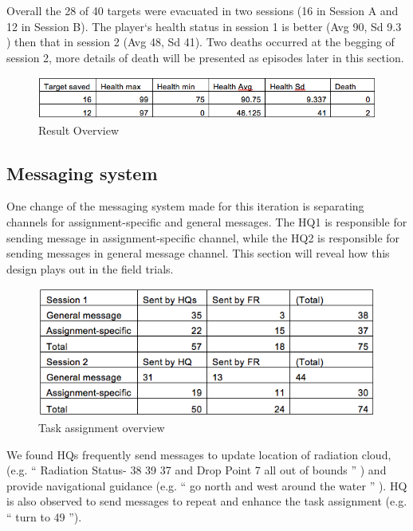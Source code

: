 Overall the 28 of 40 targets were evacuated in two sessions (16 in Session A and 12 in Session B). The player`s health status in session 1 is better  (Avg 90, Sd 9.3 ) then that in session 2 (Avg 48, Sd 41). Two deaths occurred at the begging of session 2, more details of death will be presented as episodes later in this section. \\

\begin{figure}[ht]
 \includegraphics[width=1\textwidth]{img/study3/ResultsOverview}
\caption{Result Overview}
\label{fig:ResultsOverview}
\end{figure}


\subsection{Messaging system}
One change of the messaging system made for this iteration is separating channels for assignment-specific and general messages. The HQ1 is responsible for sending message in assignment-specific channel, while the HQ2 is responsible for sending messages in general message channel. This section will reveal how this design plays out in the field trials. \\

\begin{figure}[ht]
 \includegraphics[width=1\textwidth]{img/study3/TaskAssignmentOverview}
\caption{Task assignment overview}
\label{fig:ResultsOverview}
\end{figure}

We found HQs frequently send messages to update location of radiation cloud, (e.g. `` Radiation Status- 38  39  37 and Drop Point 7 all out of bounds '' ) and provide navigational guidance (e.g. `` go north  and west around the water '' ). HQ is also observed to send messages to repeat and enhance the task assignment (e.g. `` turn to 49 '').\\

